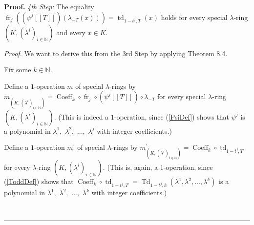 \documentclass[numbers=enddot,12pt,final,onecolumn,notitlepage]{scrartcl}%
\newenvironment{proof}[1][Proof]{\noindent\textbf{#1.} }{\ \rule{0.5em}{0.5em}}
\begin{document}
\begin{proof}
\textit{4th Step:} The equality $\operatorname*{fr}\nolimits_{j}\left(
\left(  \psi^{j}\left[  \left[  T\right]  \right]  \right)  \left(
\lambda_{-T}\left(  x\right)  \right)  \right)  =\operatorname*{td}%
\nolimits_{1-t^{j},T}\left(  x\right)  $ holds for every special $\lambda
$-ring $\left(  K,\left(  \lambda^{i}\right)  _{i\in\mathbb{N}}\right)  $ and
every $x\in K$.

\textit{Proof.} We want to derive this from the 3rd Step by applying Theorem 8.4.

Fix some $k\in\mathbb{N}$.

Define a $1$-operation $m$ of special $\lambda$-rings by $m_{\left(  K,\left(
\lambda^{i}\right)  _{i\in\mathbb{N}}\right)  }=\operatorname*{Coeff}%
\nolimits_{k}\circ\operatorname*{fr}\nolimits_{j}\circ\left(  \psi^{j}\left[
\left[  T\right]  \right]  \right)  \circ\lambda_{-T}$ for every special
$\lambda$-ring $\left(  K,\left(  \lambda^{i}\right)  _{i\in\mathbb{N}%
}\right)  $. (This is indeed a $1$-operation, since (\ref{PsiDef}) shows that
$\psi^{j}$ is a polynomial in $\lambda^{1},$ $\lambda^{2},$ $...,$
$\lambda^{j}$ with integer coefficients.)

Define a $1$-operation $m^{\prime}$ of special $\lambda$-rings by $m_{\left(
K,\left(  \lambda^{i}\right)  _{i\in\mathbb{N}}\right)  }^{\prime
}=\operatorname*{Coeff}\nolimits_{k}\circ\operatorname*{td}\nolimits_{1-t^{j}%
,T}$ for every $\lambda$-ring $\left(  K,\left(  \lambda^{i}\right)
_{i\in\mathbb{N}}\right)  $. (This is, again, a $1$-operation, since
(\ref{ToddDef}) shows that $\operatorname*{Coeff}\nolimits_{k}\circ
\operatorname*{td}\nolimits_{1-t^{j},T}=\operatorname*{Td}\nolimits_{1-t^{j}%
,k}\left(  \lambda^{1},\lambda^{2},...,\lambda^{k}\right)  $ is a polynomial
in $\lambda^{1},$ $\lambda^{2},$ $...,$ $\lambda^{k}$ with integer coefficients.)


\end{proof}
\end{document}
